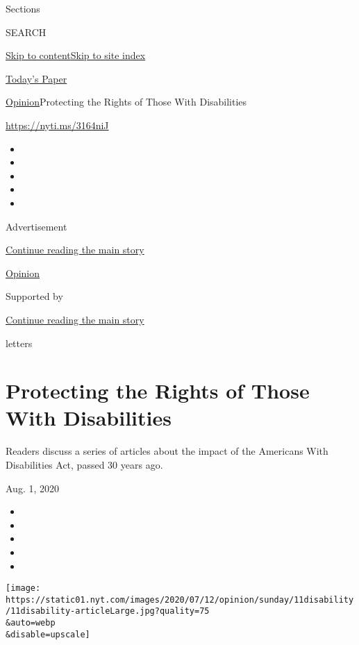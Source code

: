 Sections

SEARCH

\protect\hyperlink{site-content}{Skip to
content}\protect\hyperlink{site-index}{Skip to site index}

\href{https://myaccount.nytimes.com/auth/login?response_type=cookie\&client_id=vi}{}

\href{https://www.nytimes.com/section/todayspaper}{Today's Paper}

\href{/section/opinion}{Opinion}\textbar{}Protecting the Rights of Those
With Disabilities

\url{https://nyti.ms/3164niJ}

\begin{itemize}
\item
\item
\item
\item
\item
\end{itemize}

Advertisement

\protect\hyperlink{after-top}{Continue reading the main story}

\href{/section/opinion}{Opinion}

Supported by

\protect\hyperlink{after-sponsor}{Continue reading the main story}

letters

\hypertarget{protecting-the-rights-of-those-with-disabilities}{%
\section{Protecting the Rights of Those With
Disabilities}\label{protecting-the-rights-of-those-with-disabilities}}

Readers discuss a series of articles about the impact of the Americans
With Disabilities Act, passed 30 years ago.

Aug. 1, 2020

\begin{itemize}
\item
\item
\item
\item
\item
\end{itemize}

\texttt{[image: https://static01.nyt.com/images/2020/07/12/opinion/sunday/11disability/11disability-articleLarge.jpg?quality=75\\\&auto=webp\\\&disable=upscale]}

